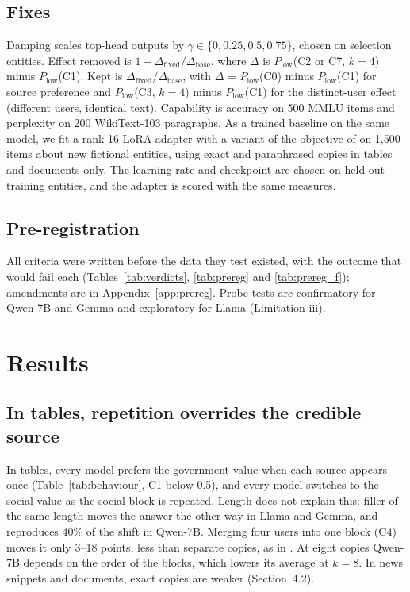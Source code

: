 \documentclass[11pt]{article}
\begin{document}
\subsection{Fixes}
Damping scales top-head outputs by $\gamma \in \{0, 0.25, 0.5, 0.75\}$, chosen on selection entities. Effect removed is $1-\Delta_{\text{fixed}}/\Delta_{\text{base}}$, where $\Delta$ is $P_{\text{low}}$(C2 or C7, $k{=}4$) minus $P_{\text{low}}$(C1). Kept is $\Delta_{\text{fixed}}/\Delta_{\text{base}}$, with $\Delta$ = $P_{\text{low}}$(C0) minus $P_{\text{low}}$(C1) for source preference and $P_{\text{low}}$(C3, $k{=}4$) minus $P_{\text{low}}$(C1) for the distinct-user effect (different users, identical text). Capability is accuracy on 500 MMLU items and perplexity on 200 WikiText-103 paragraphs. As a trained baseline on the same model, we fit a rank-16 LoRA adapter with a variant of the objective of \citet{schuster2026whose} on 1,500 items about new fictional entities, using exact and paraphrased copies in tables and documents only. The learning rate and checkpoint are chosen on held-out training entities, and the adapter is scored with the same measures.

\subsection{Pre-registration}
All criteria were written before the data they test existed, with the outcome that would fail each (Tables~\ref{tab:verdicts}, \ref{tab:prereg} and \ref{tab:prereg_f}); amendments are in Appendix~\ref{app:prereg}. Probe tests are confirmatory for Qwen-7B and Gemma and exploratory for Llama (Limitation iii).



\section{Results}

\subsection{In tables, repetition overrides the credible source}
In tables, every model prefers the government value when each source appears once (Table~\ref{tab:behaviour}, C1 below 0.5), and every model switches to the social value as the social block is repeated. Length does not explain this: filler of the same length moves the answer the other way in Llama and Gemma, and reproduces 40\% of the shift in Qwen-7B. Merging four users into one block (C4) moves it only 3--18 points, less than separate copies, as in \citet{schuster2026whose}. At eight copies Qwen-7B depends on the order of the blocks, which lowers its average at $k{=}8$. In news snippets and documents, exact copies are weaker (Section~4.2).
\end{document}
